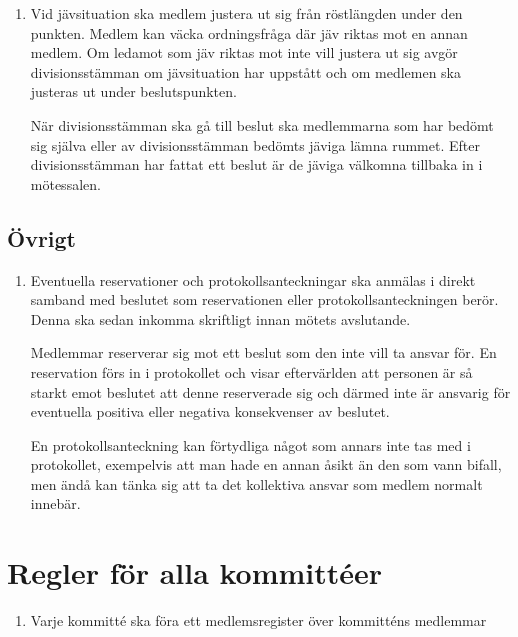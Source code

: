 \documentclass{dvd}
\begin{document}
\begin{enumerate}[label=\arabic* §, ref=\arabic*]
	\item Vid jävsituation ska medlem justera ut sig från röstlängden under den punkten.
	      Medlem kan väcka ordningsfråga där jäv riktas mot en annan medlem.
	      Om ledamot som jäv riktas mot inte vill justera ut sig avgör divisionsstämman om jävsituation har uppstått och om medlemen ska justeras ut under beslutspunkten.

	      När divisionsstämman ska gå till beslut ska medlemmarna som har bedömt sig själva eller av divisionsstämman bedömts jäviga lämna rummet.
	      Efter divisionsstämman har fattat ett beslut är de jäviga välkomna tillbaka in i mötessalen.
\end{enumerate}

\subsection{Övrigt}

\begin{enumerate}[label=\arabic* §, ref=\arabic*]
	\item Eventuella reservationer och protokollsanteckningar ska anmälas i direkt samband med beslutet som reservationen eller protokollsanteckningen berör.
	      Denna ska sedan inkomma skriftligt innan mötets avslutande.

	      Medlemmar reserverar sig mot ett beslut som den inte vill ta ansvar för.
	      En reservation förs in i protokollet och visar eftervärlden att personen är så starkt emot beslutet att denne reserverade sig och därmed inte är ansvarig för eventuella positiva eller negativa konsekvenser av beslutet.

	      En protokollsanteckning kan förtydliga något som annars inte tas med i protokollet, exempelvis att man hade en annan åsikt än den som vann bifall, men ändå kan tänka sig att ta det kollektiva ansvar som medlem normalt innebär.
\end{enumerate}

\section{Regler för alla kommittéer}

\begin{enumerate}[label=\arabic* §, ref=\arabic*]
	\item Varje kommitté ska föra ett medlemsregister över kommitténs medlemmar


\end{enumerate}
\end{document}
